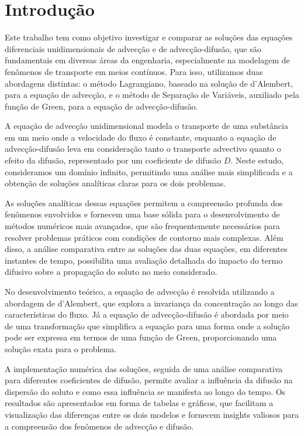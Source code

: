 \section{Introdução}

Este trabalho tem como objetivo investigar e comparar as soluções das equações diferenciais unidimensionais de advecção e de advecção-difusão, que são fundamentais em diversas áreas da engenharia, especialmente na modelagem de fenômenos de transporte em meios contínuos. Para isso, utilizamos duas abordagens distintas: o método Lagrangiano, baseado na solução de d’Alembert, para a equação de advecção, e o método de Separação de Variáveis, auxiliado pela função de Green, para a equação de advecção-difusão.

A equação de advecção unidimensional modela o transporte de uma substância em um meio onde a velocidade do fluxo é constante, enquanto a equação de advecção-difusão leva em consideração tanto o transporte advectivo quanto o efeito da difusão, representado por um coeficiente de difusão \( D \). Neste estudo, consideramos um domínio infinito, permitindo uma análise mais simplificada e a obtenção de soluções analíticas claras para os dois problemas.

As soluções analíticas dessas equações permitem a compreensão profunda dos fenômenos envolvidos e fornecem uma base sólida para o desenvolvimento de métodos numéricos mais avançados, que são frequentemente necessários para resolver problemas práticos com condições de contorno mais complexas. Além disso, a análise comparativa entre as soluções das duas equações, em diferentes instantes de tempo, possibilita uma avaliação detalhada do impacto do termo difusivo sobre a propagação do soluto no meio considerado.

No desenvolvimento teórico, a equação de advecção é resolvida utilizando a abordagem de d'Alembert, que explora a invariança da concentração ao longo das características do fluxo. Já a equação de advecção-difusão é abordada por meio de uma transformação que simplifica a equação para uma forma onde a solução pode ser expressa em termos de uma função de Green, proporcionando uma solução exata para o problema.

A implementação numérica das soluções, seguida de uma análise comparativa para diferentes coeficientes de difusão, permite avaliar a influência da difusão na dispersão do soluto e como essa influência se manifesta ao longo do tempo. Os resultados são apresentados em forma de tabelas e gráficos, que facilitam a visualização das diferenças entre os dois modelos e fornecem insights valiosos para a compreensão dos fenômenos de advecção e difusão.